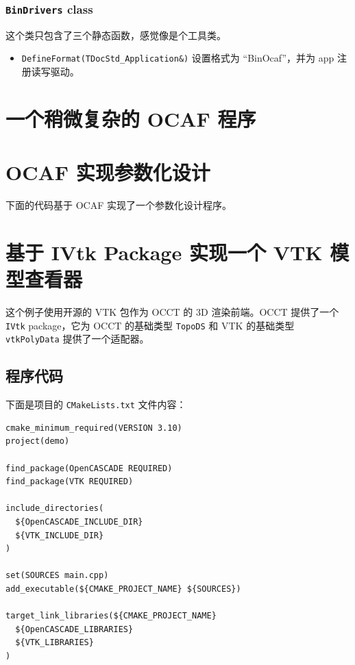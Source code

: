 \documentclass[11pt]{article}
\let\oldsection\section
\renewcommand{\section}{\clearpage\oldsection}
\begin{document}
\subsubsection{\texttt{BinDrivers} class}
\label{sec:orgdfa2f79}

这个类只包含了三个静态函数，感觉像是个工具类。

\begin{itemize}
\item \texttt{DefineFormat(TDocStd\_Application\&)} 设置格式为 ``BinOcaf''，并为 app 注册读写驱动。
\end{itemize}
\section{一个稍微复杂的 OCAF 程序}
\label{sec:orgb37e3e8}


\section{OCAF 实现参数化设计}
\label{sec:org27bce77}

下面的代码基于 OCAF 实现了一个参数化设计程序。
\section{基于 IVtk Package 实现一个 VTK 模型查看器}
\label{sec:org1666199}

这个例子使用开源的 VTK 包作为 OCCT 的 3D 渲染前端。OCCT 提供了一个 \texttt{IVtk} package，它为 OCCT 的基础类型 \texttt{TopoDS} 和 VTK 的基础类型 \texttt{vtkPolyData} 提供了一个适配器。
\subsection{程序代码}
\label{sec:org9449711}

下面是项目的 \texttt{CMakeLists.txt} 文件内容：

\begin{verbatim}
cmake_minimum_required(VERSION 3.10)
project(demo)

find_package(OpenCASCADE REQUIRED)
find_package(VTK REQUIRED)

include_directories(
  ${OpenCASCADE_INCLUDE_DIR}
  ${VTK_INCLUDE_DIR}
)

set(SOURCES main.cpp)
add_executable(${CMAKE_PROJECT_NAME} ${SOURCES})

target_link_libraries(${CMAKE_PROJECT_NAME}
  ${OpenCASCADE_LIBRARIES}
  ${VTK_LIBRARIES}
)
\end{verbatim}
\end{document}
